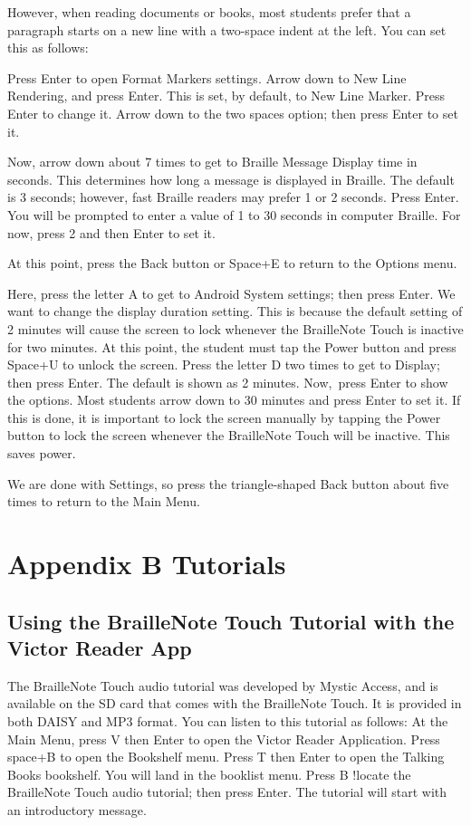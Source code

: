 \documentclass[10pt,letterpaper,twoside]{report}
\begin{document}
{{{However, when reading documents or books, most students prefer that a paragraph starts on a new line with a two-space indent at the left. You can set this as follows:

Press Enter to open Format Markers settings.
Arrow down to New Line Rendering, and press Enter. This is set, by default, to New Line Marker. Press Enter to change it.
Arrow down to the two spaces option; then press Enter to set it.

Now, arrow down about 7 times to get to Braille Message Display time in seconds. This determines how long a message is displayed in Braille. The default is 3 seconds; however, fast Braille readers may prefer 1 or 2 seconds. Press Enter. You will be prompted to enter a value of 1 to 30 seconds in computer Braille. For now, press 2 and then Enter to set it.

At this point, press the Back button or Space+E to return to the Options menu.

Here, press the letter A to get to Android System settings; then press Enter. We want to change the display duration setting. This is because the default setting of 2 minutes will cause the screen to lock whenever the BrailleNote Touch is inactive for two minutes. At this point, the student must tap the Power button and press Space+U to unlock the screen.
Press the letter D two times to get to Display; then press Enter. The default is shown as 2 minutes.
Now,\ press Enter to show the options.  Most students arrow down to 30 minutes and press Enter to set it. If this is done, it is important to lock the screen manually by tapping the Power button to lock the screen whenever the BrailleNote Touch will be inactive. This saves power.

We are done with Settings, so press the triangle-shaped Back button about five times to return to the Main Menu.

\section{Appendix B Tutorials}


\subsection{Using the BrailleNote Touch Tutorial with the Victor Reader App}

The BrailleNote Touch audio tutorial was developed by Mystic Access, and is available on the SD card that comes with the BrailleNote Touch. It is provided in both DAISY and MP3 format. You can listen to this tutorial as follows:
At the Main Menu, press V then Enter to open the Victor Reader Application.
Press space+B to open the Bookshelf menu.
Press T then Enter to open the Talking Books bookshelf. You will land in the booklist menu.
Press B !locate the BrailleNote Touch audio tutorial; then press Enter. The tutorial will start with an introductory message.
}}}
\end{document}
